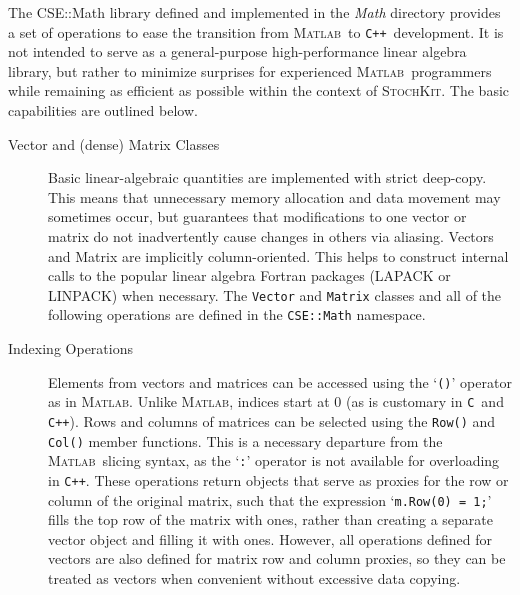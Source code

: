 \documentclass[12pt]{article}
\newcommand{\matlab}{\textsc{Matlab}}
\newcommand{\cpp}{\texttt{C++}}%
\newcommand{\clang}{\texttt{C}}%
\newcommand{\api}[1]{\texttt{#1}}
\newcommand{\srccode}[1]{\texttt{#1}}
\newcommand{\sspack}{\textsc{StochKit}}
\begin{document}
The CSE::Math library defined and implemented in the {\it Math} directory
provides a set of operations to ease the transition from \matlab\
to \cpp\ development. It is not intended to serve as a
general-purpose high-performance linear algebra library,
but rather to minimize surprises for experienced \matlab\ programmers while
remaining as efficient as possible within the context of \sspack.
The basic capabilities are outlined below.
\begin{description}

  \item[Vector and (dense) Matrix Classes] Basic linear-algebraic
  quantities are implemented with strict deep-copy.  This means that
  unnecessary memory allocation and data movement may sometimes occur,
  but guarantees that modifications to one vector or matrix do not
  inadvertently cause changes in others via aliasing.  Vectors and
  Matrix are implicitly column-oriented. This helps to construct internal
  calls to the popular linear algebra Fortran packages (LAPACK or LINPACK)
  when necessary. The \srccode{Vector} and \srccode{Matrix} classes and
  all of the following operations are
  defined in the \srccode{CSE::Math} namespace.

  \item[Indexing Operations] Elements from vectors and matrices can be
  accessed using the `\srccode{()}' operator as in \matlab.  Unlike
  \matlab, indices start at 0 (as is customary in \clang\  and \cpp).
  Rows and columns of matrices can be selected using the \api{Row()}
  and \api{Col()} member functions.  This is a necessary departure
  from the \matlab\ slicing syntax, as the `\srccode{:}' operator is
  not available for overloading in \cpp.  These operations return
  objects that serve as proxies for the row or column of the original
  matrix, such that the expression `\srccode{m.Row(0) = 1;}' fills the
  top row of the matrix with ones, rather than creating a separate
  vector object and filling it with ones.  However, all operations
  defined for vectors are also defined for matrix row and column
  proxies, so they can be treated as vectors when convenient without
  excessive data copying.


\end{description}
\end{document}
